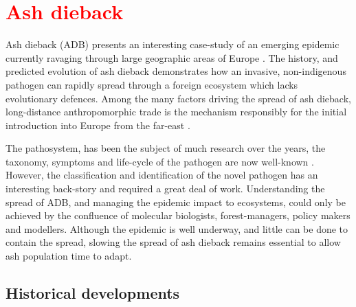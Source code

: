 \section{\textcolor{red}{Ash dieback}}




\label{ch2:ash-dieback}
Ash dieback (ADB) presents an interesting case-study of an emerging epidemic currently ravaging through large geographic areas of Europe \cite{enderle2019overview}.
The history, and predicted evolution of ash dieback demonstrates how an invasive, non-indigenous pathogen can rapidly spread through a foreign ecosystem which lacks evolutionary defences.
Among the many factors driving the spread of ash dieback, long-distance anthropomorphic trade is the mechanism responsibly for the initial introduction into Europe from the far-east \cite{zhao2013hymenoscyphus, queloz2011cryptic}.

The pathosystem, has been the subject of much research over the years, the taxonomy, symptoms and life-cycle of the pathogen are now well-known \cite{https://doi.org/10.1111/mpp.12073}.
However, the classification and identification of the novel pathogen has an interesting back-story and required a great deal of work.
Understanding the spread of ADB, and managing the epidemic impact to ecosystems, could only be achieved by the confluence of molecular biologists, forest-managers, policy makers and modellers.
Although the epidemic is well underway, and little can be done to contain the spread, slowing the spread of ash dieback remains essential to allow ash population time to adapt.

\subsection{Historical developments}

